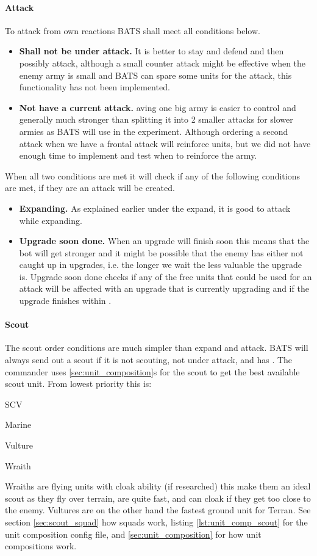 \paragraph{Attack}
To attack from own reactions BATS shall meet all conditions below.
\begin{itemize}
  \item \textbf{Shall not be under attack.} It is better to stay and defend and then possibly
	attack, although a small counter attack might be effective when the enemy army is small and BATS
	can spare some units for the attack, this functionality has not been implemented.
  \item \textbf{Not have a current attack.} aving one big army is easier to control and generally
	much stronger than splitting it into 2 smaller attacks for slower armies\cite{day9} as BATS will
	use in the experiment. Although ordering a second attack when we have a frontal attack will
	reinforce units, but we did not have enough time to implement and test when to reinforce the
	army.
\end{itemize}
When all two conditions are met it will check if any of the following conditions are met, if they
are an attack will be created.
\begin{itemize}
	\item \textbf{Expanding.} As explained earlier under the expand, it is good to attack while
		expanding.
	\item \textbf{Upgrade soon done.} When an upgrade will finish soon this means that the bot will
		get stronger and it might be possible that the enemy has either not caught up in upgrades, i.e.
		the longer we wait the less valuable the upgrade is\cite{day9}. Upgrade soon done checks if any
		of the free units that could be used for an attack will be affected with an upgrade that is
		currently upgrading and if the upgrade finishes within \classificationUpgradeSoonDone.
\end{itemize}

\paragraph{Scout}
The scout order conditions are much simpler than expand and attack. BATS will always send out a
scout if it is not scouting, not under attack, and has \commanderScoutOnWorkerCount. The commander
uses \ref{sec:unit_composition}s for the scout to get the best available scout unit. From lowest
priority this is:
\vspace{0.5em}
\begin{compactenum}
  \item SCV
	\item Marine
	\item Vulture
	\item Wraith
\end{compactenum}
Wraiths are flying units with cloak ability (if researched) this make them an ideal scout as they
fly over terrain, are quite fast, and can cloak if they get too close to the enemy. Vultures are on
the other hand the fastest ground unit for Terran. See section \ref{sec:scout_squad} how squads
work, listing \ref{lst:unit_comp_scout} for the unit composition config file, and
\ref{sec:unit_composition} for how unit compositions work.

